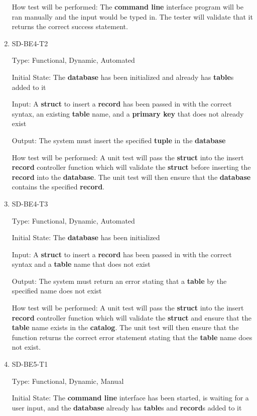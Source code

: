 \documentclass[12pt, titlepage]{article}
\begin{document}
\begin{enumerate}
How test will be performed: The \textbf{command line} interface program will be ran manually and the input would be typed in. The tester will validate that it returns the correct success statement.

\item{SD-BE4-T2}

Type: Functional, Dynamic, Automated
					
Initial State: The \textbf{database} has been initialized and already has \textbf{table}s added to it
					
Input: A \textbf{struct} to insert a \textbf{record} has been passed in with the correct syntax, an existing \textbf{table} name, and a \textbf{primary key} that does not already exist
					
Output: The system must insert the specified \textbf{tuple} in the \textbf{database}
					
How test will be performed: A unit test will pass the \textbf{struct} into the insert \textbf{record} controller function which will validate the \textbf{struct} before inserting the \textbf{record} into the \textbf{database}. The unit test will then ensure that the \textbf{database} contains the specified \textbf{record}.

\item{SD-BE4-T3}

Type: Functional, Dynamic, Automated
					
Initial State: The \textbf{database} has been initialized
					
Input: A \textbf{struct} to insert a \textbf{record} has been passed in with the correct syntax and a \textbf{table} name that does not exist
					
Output: The system must return an error stating that a \textbf{table} by the specified name does not exist
					
How test will be performed: A unit test will pass the \textbf{struct} into the insert \textbf{record} controller function which will validate the \textbf{struct} and ensure that the \textbf{table} name exists in the \textbf{catalog}. The unit test will then ensure that the function returns the correct error statement stating that the \textbf{table} name does not exist.

\item{SD-BE5-T1}

Type: Functional, Dynamic, Manual
					
Initial State: The \textbf{command line} interface has been started, is waiting for a user input, and the \textbf{database} already has \textbf{table}s and \textbf{record}s added to it
					

\end{enumerate}
\end{document}
